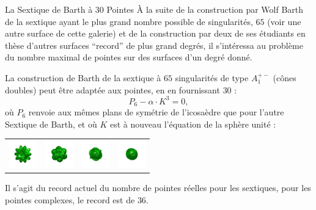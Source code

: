 \begin{surferPage}{La Sextique de Barth à 30 Pointes}
    \`A la suite de la construction par Wolf Barth de la sextique ayant le plus grand nombre possible
    de singularités, $65$ (voir une autre surface de cette galerie) et
    de la construction par deux de ses étudiants en thèse d'autres surfaces ``record''
    de plus grand degrés, il s'intéressa au problème du nombre maximal
    de pointes sur des surfaces d'un degré donné.

   La construction de Barth de la sextique à $65$ singularités de type
    $A_1^{+-}$ (cônes doubles) peut être adaptée aux pointes, en en fournissant $30$ : 
    \[P_6 - \alpha \cdot K^3=0,\]
  où $P_6$ renvoie aux mêmes plans de symétrie de l'icosaèdre que pour
    l'autre Sextique de Barth, et où $K$ est
    à nouveau l'équation de la sphère unité :
    \vspace*{-0.4em}
    \begin{center}
      \begin{tabular}{c@{\ }c@{\ }c@{\ }c}
        \includegraphics[height=1.2cm]{./../../common/images/barthsextic_30A2}
        &
        \includegraphics[height=1.2cm]{./../../common/images/barthsextic_30A2_3}
        &
        \includegraphics[height=1.2cm]{./../../common/images/barthsextic_30A2_5}
        &
        \includegraphics[height=1.2cm]{./../../common/images/barthsextic_30A2_6}
      \end{tabular}
    \end{center}    
    \vspace*{-0.3em}
     Il s'agit du record actuel du nombre de pointes réelles pour les
    sextiques, pour les pointes complexes, le record est de $36$.
\end{surferPage}
